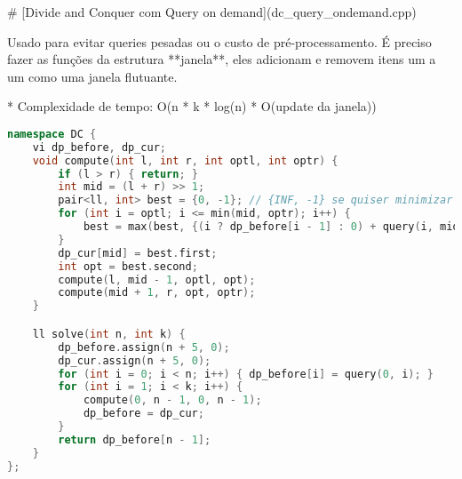 \documentclass[11pt, a4paper, twoside]{article}
\begin{document}
\# [Divide and Conquer com Query on demand](dc\_query\_ondemand.cpp)


Usado para evitar queries pesadas ou o custo de pré-processamento.  
É preciso fazer as funções da estrutura **janela**, eles adicionam e removem itens um a um como uma janela flutuante.

* Complexidade de tempo: O(n * k * log(n) * O(update da janela))



\begin{lstlisting}[language=C++]
namespace DC {
    vi dp_before, dp_cur;
    void compute(int l, int r, int optl, int optr) {
        if (l > r) { return; }
        int mid = (l + r) >> 1;
        pair<ll, int> best = {0, -1}; // {INF, -1} se quiser minimizar
        for (int i = optl; i <= min(mid, optr); i++) {
            best = max(best, {(i ? dp_before[i - 1] : 0) + query(i, mid), i}); // min() se quiser minimizar
        }
        dp_cur[mid] = best.first;
        int opt = best.second;
        compute(l, mid - 1, optl, opt);
        compute(mid + 1, r, opt, optr);
    }

    ll solve(int n, int k) {
        dp_before.assign(n + 5, 0);
        dp_cur.assign(n + 5, 0);
        for (int i = 0; i < n; i++) { dp_before[i] = query(0, i); }
        for (int i = 1; i < k; i++) {
            compute(0, n - 1, 0, n - 1);
            dp_before = dp_cur;
        }
        return dp_before[n - 1];
    }
};
\end{lstlisting}
\end{document}
